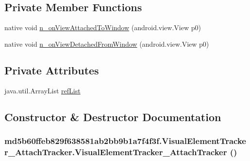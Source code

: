 \subsection*{Private Member Functions}
\begin{CompactItemize}
\item 
native void \hyperlink{classmd5b60ffeb829f638581ab2bb9b1a7f4f3f_1_1_visual_element_tracker___attach_tracker_41e798b3736e9db4d141ad9f726e09e0}{n\_\-onViewAttachedToWindow} (android.view.View p0)
\item 
native void \hyperlink{classmd5b60ffeb829f638581ab2bb9b1a7f4f3f_1_1_visual_element_tracker___attach_tracker_d123aa38e94e7b49e07d151618bf7749}{n\_\-onViewDetachedFromWindow} (android.view.View p0)
\end{CompactItemize}
\subsection*{Private Attributes}
\begin{CompactItemize}
\item 
java.util.ArrayList \hyperlink{classmd5b60ffeb829f638581ab2bb9b1a7f4f3f_1_1_visual_element_tracker___attach_tracker_54dbcf5c7b4ceea634f9e3f1995dccb1}{refList}
\end{CompactItemize}


\subsection{Constructor \& Destructor Documentation}
\hypertarget{classmd5b60ffeb829f638581ab2bb9b1a7f4f3f_1_1_visual_element_tracker___attach_tracker_4e41b67296eb503919324db1e277448e}{
\subsubsection[{VisualElementTracker\_\-AttachTracker}]{\setlength{\rightskip}{0pt plus 5cm}md5b60ffeb829f638581ab2bb9b1a7f4f3f.VisualElementTracker\_\-AttachTracker.VisualElementTracker\_\-AttachTracker ()}}
\label{classmd5b60ffeb829f638581ab2bb9b1a7f4f3f_1_1_visual_element_tracker___attach_tracker_4e41b67296eb503919324db1e277448e}




